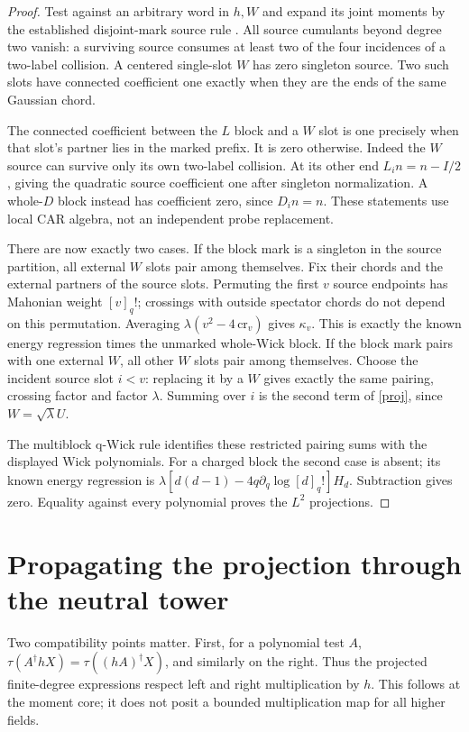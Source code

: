 \documentclass[11pt]{article}
\newcommand{\tr}{\tau}
\begin{document}
\begin{proof}
Test against an arbitrary word in $h,W$ and expand its joint
moments by the established disjoint-mark source rule
\cite{multi,higher}. All source cumulants beyond degree two vanish:
a surviving source consumes at least two of the four incidences
of a two-label collision. A centered single-slot $W$ has zero
singleton source. Two such slots have connected coefficient one
exactly when they are the ends of the same Gaussian chord.

The connected coefficient between the $L$ block and a $W$ slot
is one precisely when that slot's partner lies in the marked
prefix. It is zero otherwise. Indeed the $W$ source can survive
only its own two-label collision. At its other end $L_i n=n-I/2$,
giving the quadratic source coefficient one after singleton
normalization. A whole-$D$ block instead has coefficient zero,
since $D_i n=n$. These statements use local CAR algebra, not an
independent probe replacement.

There are now exactly two cases. If the block mark is a singleton
in the source partition, all external $W$ slots pair among
themselves. Fix their chords and the external partners of the
source slots. Permuting the first $v$ source endpoints has
Mahonian weight $[v]_q!$; crossings with outside spectator chords
do not depend on this permutation. Averaging
$\lambda(v^2-4\,\mathrm{cr}_{v})$ gives $\kappa_v$.
This is exactly the known energy regression times the unmarked
whole-Wick block. If the block mark pairs with one external $W$,
all other $W$ slots pair among themselves. Choose the incident
source slot $i<v$: replacing it by a $W$ gives exactly the same
pairing, crossing factor and factor $\lambda$. Summing over $i$
is the second term of \eqref{proj}, since $W=\sqrt\lambda U$.

The multiblock q-Wick rule \cite{EP} identifies these restricted
pairing sums with the displayed Wick polynomials. For a charged
block the second case is absent; its known energy regression is
$\lambda[d(d-1)-4q\partial_q\log[d]_q!]H_d$. Subtraction gives
zero. Equality against every polynomial proves the $L^2$ projections.
\end{proof}

\newpage
\section{Propagating the projection through the neutral tower}
Two compatibility points matter. First, for a polynomial test $A$,
$\tr(A^\dagger hX)=\tr((hA)^\dagger X)$, and similarly on the
right. Thus the projected finite-degree expressions respect left
and right multiplication by $h$. This follows at the moment core;
it does not posit a bounded multiplication map for all higher fields.
\end{document}
